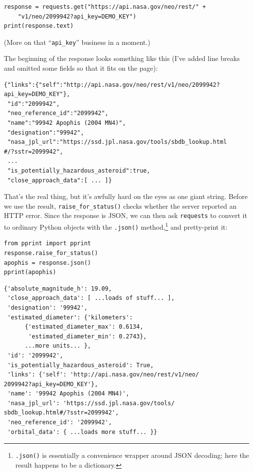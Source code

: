 \begin{Verbatim}[fontsize=\small,samepage=true,frame=single,framesep=3mm]
response = requests.get("https://api.nasa.gov/neo/rest/" +
    "v1/neo/2099942?api_key=DEMO_KEY")
print(response.text)
\end{Verbatim}
\vspace{-.2in}

(More on that ``\texttt{api\_key}'' business in a moment.)


The beginning of the response looks something like this (I've added line
breaks and omitted some fields so that it fits on the page):

\begin{Verbatim}[fontsize=\scriptsize,samepage=true,frame=leftline,framesep=5mm,framerule=1mm]
{"links":{"self":"http://api.nasa.gov/neo/rest/v1/neo/2099942?
api_key=DEMO_KEY"},
 "id":"2099942",
 "neo_reference_id":"2099942",
 "name":"99942 Apophis (2004 MN4)",
 "designation":"99942",
 "nasa_jpl_url":"https://ssd.jpl.nasa.gov/tools/sbdb_lookup.html
#/?sstr=2099942",
 ...
 "is_potentially_hazardous_asteroid":true,
 "close_approach_data":[ ... ]}
\end{Verbatim}



That's the real thing, but it's awfully hard on the eyes as one giant string.
Before we use the result, \texttt{raise\_for\_status()} checks whether the
server reported an HTTP error. Since the response is JSON, we can then ask
\texttt{requests} to convert it to ordinary Python objects with the
\texttt{.json()} method,\footnote{\texttt{.json()} is essentially a
convenience wrapper around JSON decoding; here the result happens to be a
dictionary.} and pretty-print it:

\begin{Verbatim}[fontsize=\small,samepage=true,frame=single,framesep=3mm]
from pprint import pprint
response.raise_for_status()
apophis = response.json()
pprint(apophis)
\end{Verbatim}

\begin{Verbatim}[fontsize=\small,samepage=true,frame=leftline,framesep=5mm,framerule=1mm]
{'absolute_magnitude_h': 19.09,
 'close_approach_data': [ ...loads of stuff... ],
 'designation': '99942',
 'estimated_diameter': {'kilometers':
      {'estimated_diameter_max': 0.6134,
       'estimated_diameter_min': 0.2743},
      ...more units... },
 'id': '2099942',
 'is_potentially_hazardous_asteroid': True,
 'links': {'self': 'http://api.nasa.gov/neo/rest/v1/neo/
2099942?api_key=DEMO_KEY'},
 'name': '99942 Apophis (2004 MN4)',
 'nasa_jpl_url': 'https://ssd.jpl.nasa.gov/tools/
sbdb_lookup.html#/?sstr=2099942',
 'neo_reference_id': '2099942',
 'orbital_data': { ...loads more stuff... }}
\end{Verbatim}

